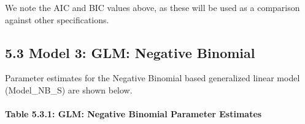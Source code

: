 \documentclass[]{article}
\let\oldparagraph\paragraph
\renewcommand{\paragraph}[1]{\oldparagraph{#1}\mbox{}}
\begin{document}
We note the AIC and BIC values above, as these will be used as a
comparison against other specifications.

\subsection{5.3 Model 3: GLM: Negative
Binomial}\label{model-3-glm-negative-binomial}

Parameter estimates for the Negative Binomial based generalized linear
model (Model\_NB\_S) are shown below.

\paragraph{Table 5.3.1: GLM: Negative Binomial Parameter
Estimates}\label{table-5.3.1-glm-negative-binomial-parameter-estimates}
\end{document}
